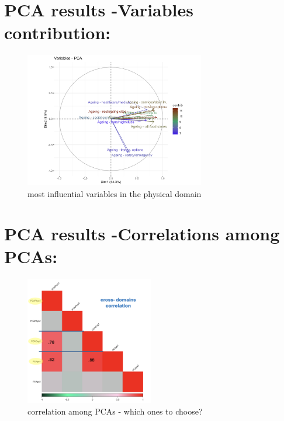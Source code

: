 \documentclass[
  letterpaper,
  DIV=11,
  numbers=noendperiod]{scrartcl}
\begin{document}
\hypertarget{pca-results--variables-contribution-2}{%
\section{PCA results -Variables
contribution:}\label{pca-results--variables-contribution-2}}

\begin{figure}

{\centering \includegraphics[width=0.7\textwidth,height=\textheight]{imgs/pca_var_ageing.png}

}

\caption{most influential variables in the physical domain}

\end{figure}

\hypertarget{pca-results--correlations-among-pcas}{%
\section{PCA results -Correlations among
PCAs:}\label{pca-results--correlations-among-pcas}}

\begin{figure}

{\centering \includegraphics[width=0.5\textwidth,height=\textheight]{imgs/crossDomainCorrelations.png}

}

\caption{correlation among PCAs - which ones to choose?}

\end{figure}
\end{document}
